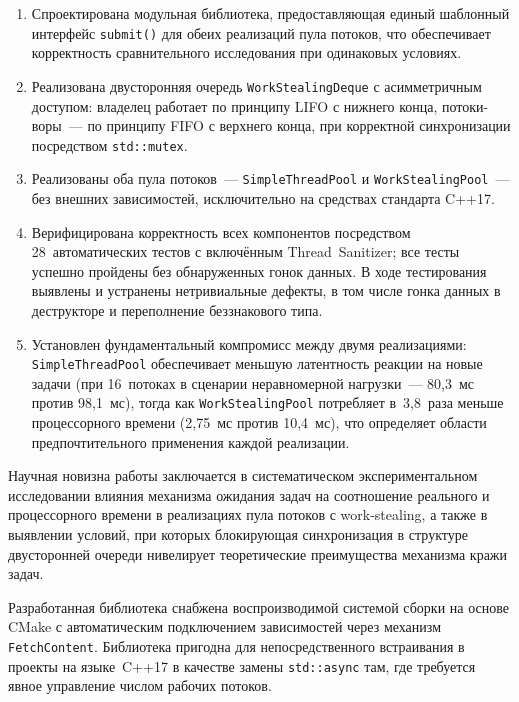 \begin{enumerate}
  \item Спроектирована модульная библиотека, предоставляющая единый
    шаблонный интерфейс \texttt{submit()} для обеих реализаций пула потоков,
    что обеспечивает корректность сравнительного исследования при одинаковых
    условиях.

  \item Реализована двусторонняя очередь \texttt{WorkStealingDeque}
    с асимметричным доступом: владелец работает по принципу LIFO с нижнего
    конца, потоки-воры~--- по принципу FIFO с верхнего конца, при
    корректной синхронизации посредством \texttt{std::mutex}.

  \item Реализованы оба пула потоков~--- \texttt{SimpleThreadPool}
    и \texttt{WorkStealingPool}~--- без внешних зависимостей, исключительно
    на средствах стандарта C++17.

  \item Верифицирована корректность всех компонентов посредством
    28~автоматических тестов с включённым Thread~Sanitizer; все тесты
    успешно пройдены без обнаруженных гонок данных. В ходе тестирования
    выявлены и устранены нетривиальные дефекты, в том числе гонка данных в
    деструкторе и переполнение беззнакового типа.

  \item Установлен фундаментальный компромисс между двумя
    реализациями: \texttt{SimpleThreadPool} обеспечивает меньшую латентность
    реакции на новые задачи (при 16~потоках в сценарии неравномерной
    нагрузки~--- 80{,}3~мс против 98{,}1~мс), тогда как
    \texttt{WorkStealingPool} потребляет в~3{,}8~раза меньше процессорного
    времени (2{,}75~мс против 10{,}4~мс), что определяет области
    предпочтительного применения каждой реализации.
\end{enumerate}

Научная новизна работы заключается в систематическом экспериментальном
исследовании влияния механизма ожидания задач на соотношение реального и
процессорного времени в реализациях пула потоков с work-stealing, а также в
выявлении условий, при которых блокирующая синхронизация в структуре
двусторонней очереди нивелирует теоретические преимущества механизма кражи
задач.

Разработанная библиотека снабжена воспроизводимой системой сборки на основе CMake с автоматическим
подключением зависимостей через механизм \texttt{FetchContent}. Библиотека
пригодна для непосредственного встраивания в проекты на языке~C++17 в качестве
замены \texttt{std::async} там, где требуется явное управление числом рабочих
потоков.
